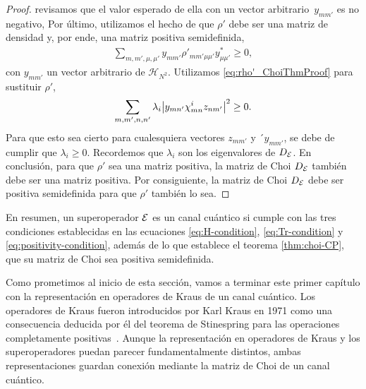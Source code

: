 \begin{proof}
revisamos que el valor esperado de ella con un vector arbitrario~$y_{mm'}$
es no negativo,
\here
Por último, utilizamos el hecho de que $\rho'$ debe ser una matriz 
de densidad y, por ende, una matriz positiva semidefinida,
\begin{align}
\sum_{m,m',\mu,\mu'}
y_{mm'}\rho'_{mm'\mu\mu'}y^*_{\mu\mu'}
\geq0,
\end{align}
con $y_{mm'}$ un vector arbitrario de $\mathcal{H}_{N^2}$.
Utilizamos \eqref{eq:rho'_ChoiThmProof} para sustituir $\rho'$,
\begin{align}
\sum_{m,m',n,n'}\lambda_i\abs{y_{mn'}\chi^i_{mn}z_{nm'}}^2\geq0.
\end{align}
Para que esto sea cierto para cualesquiera vectores $z_{mm'}$ y  
´$y_{mm'}$, se debe de cumplir que $\lambda_i\geq0$. Recordemos
que $\lambda_i$ son los eigenvalores de $D_{\mathcal{E}}$.
En conclusión, para que $\rho'$ sea una matriz positiva, la matriz de Choi 
$D_{\mathcal{E}}$ también debe ser una matriz positiva. 
\here
Por consiguiente, la matriz 
de Choi $D_{\mathcal{E}}$ debe ser positiva semidefinida para que $\rho'$ 
también lo sea. \newline \noindent
\here
\end{proof}
En resumen, un superoperador $\mathcal{E}$ es un canal cuántico si 
cumple con las tres condiciones establecidas en las ecuaciones 
\eqref{eq:H-condition}, \eqref{eq:Tr-condition}
y \eqref{eq:positivity-condition}, además de lo que establece 
el teorema \ref{thm:choi-CP}, que su matriz de Choi sea 
positiva semidefinida. 

Como prometimos al inicio de esta sección, vamos a terminar 
este primer capítulo con la representación en operadores de Kraus 
de un canal cuántico. Los operadores de Kraus fueron 
introducidos por Karl Kraus en 1971 como una consecuencia
deducida por él del teorema de Stinespring para las operaciones 
completamente positivas~\cite{bengtsson_zyczkowski_2017}. 
Aunque la representación en operadores de Kraus y los
superoperadores puedan parecer fundamentalmente distintos, 
ambas representaciones guardan conexión mediante 
la matriz de Choi de un canal cuántico.

